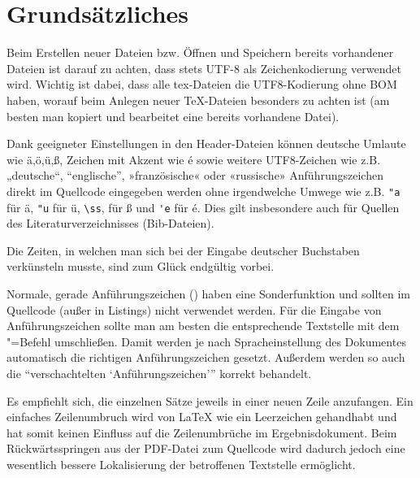 \section[Grundsätzliches]{Grundsätzliches}%
\label{sec:Grundsätzliches}
%
Beim Erstellen neuer Dateien bzw. Öffnen und Speichern bereits vorhandener Dateien ist darauf zu achten,
dass stets UTF-8 als Zeichenkodierung verwendet wird.
Wichtig ist dabei, dass alle tex-Dateien die UTF8-Kodierung ohne BOM haben,
worauf beim Anlegen neuer TeX-Dateien besonders zu achten ist
(am besten man kopiert und bearbeitet eine bereits vorhandene Datei).

Dank geeigneter Einstellungen in den Header-Dateien können deutsche Umlaute wie 
%
ä,ö,ü,ß, Zeichen mit Akzent wie é sowie weitere UTF8-Zeichen wie z.B.
%
%
„deutsche“, “englische”, »französische« oder «russische» Anführungszeichen 
direkt im Quellcode eingegeben werden ohne irgendwelche Umwege wie z.B. 
\verb+"a+ für ä,
\verb+"u+ für ü,
\verb+\ss+, für ß und
\verb+'e+ für é.
Dies gilt insbesondere auch für Quellen des Literaturverzeichnisses (Bib-Dateien).

Die Zeiten, in welchen man sich bei der Eingabe deutscher Buchstaben verkünsteln musste,
sind zum Glück endgültig vorbei.

Normale, gerade Anführungszeichen (\texttt{{\dq}}) haben eine Sonderfunktion und sollten im Quellcode (außer in Listings) nicht verwendet werden.
Für die Eingabe von Anführungszeichen sollte man am besten die entsprechende Textstelle mit dem "=Befehl umschließen.
Damit werden je nach Spracheinstellung des Dokumentes automatisch die richtigen Anführungszeichen gesetzt.
Außerdem werden so auch die \enquote{verschachtelten \enquote{Anführungszeichen}} korrekt behandelt.

Es empfiehlt sich, die einzelnen Sätze jeweils in einer neuen Zeile anzufangen.
Ein einfaches Zeilenumbruch wird von LaTeX wie ein Leerzeichen gehandhabt
und hat somit keinen Einfluss auf die Zeilenumbrüche im Ergebnisdokument.
Beim Rückwärtsspringen aus der PDF-Datei zum Quellcode wird dadurch jedoch
eine wesentlich bessere Lokalisierung der betroffenen Textstelle ermöglicht.